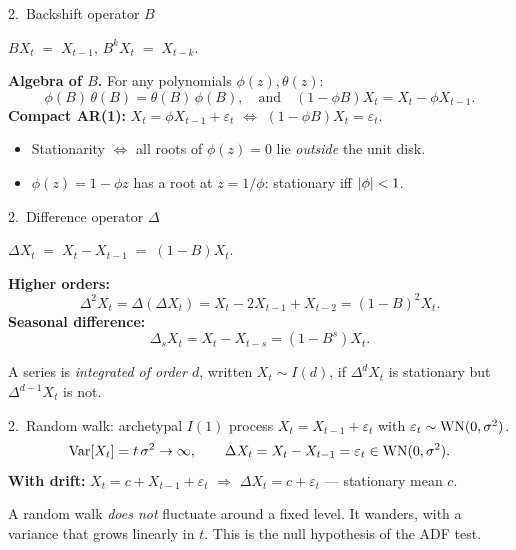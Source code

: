 \documentclass[aspectratio=169]{beamer}
\begin{document}
\begin{frame}{2.~Backshift operator $B$}
  \begin{defbox}[Backshift]
    $B X_t \;=\; X_{t-1}$, $B^k X_t \;=\; X_{t-k}$.
  \end{defbox}
  \medskip
  \textbf{Algebra of $B$.} For any polynomials $\phi(z), \theta(z)$:
  \[
    \phi(B)\, \theta(B) = \theta(B)\, \phi(B), \quad \text{and}
    \quad
    (1 - \phi B) X_t = X_t - \phi X_{t-1}.
  \]
  \medskip
  \textbf{Compact AR(1):} $X_t = \phi X_{t-1} + \varepsilon_t$
  $\Leftrightarrow$ $(1 - \phi B) X_t = \varepsilon_t$.
  \medskip
  \begin{itemize}
    \item Stationarity $\Leftrightarrow$ all roots of $\phi(z) = 0$
          lie \emph{outside} the unit disk.
    \item $\phi(z) = 1 - \phi z$ has a root at $z = 1/\phi$:
          stationary iff $\left\lvert \phi \right\rvert < 1$.
  \end{itemize}
\end{frame}

\begin{frame}{2.~Difference operator $\Delta$}
  \begin{defbox}[Difference]
    $\Delta X_t \;=\; X_t - X_{t-1} \;=\; (1 - B) X_t$.
  \end{defbox}
  \medskip
  \textbf{Higher orders:}
  \[
    \Delta^2 X_t = \Delta(\Delta X_t) = X_t - 2 X_{t-1} + X_{t-2}
                = (1 - B)^2 X_t.
  \]
  \medskip
  \textbf{Seasonal difference:}
  \[
    \Delta_s X_t = X_t - X_{t-s} = (1 - B^s) X_t.
  \]
  \medskip
  \begin{infobox}
    A series is \emph{integrated of order $d$}, written
    $X_t \sim I(d)$, if $\Delta^d X_t$ is stationary but
    $\Delta^{d-1} X_t$ is not.
  \end{infobox}
\end{frame}

\begin{frame}{2.~Random walk: archetypal $I(1)$ process}
  $X_t = X_{t-1} + \varepsilon_t$ with $\varepsilon_t \sim \mathrm{WN}(0, \sigma^2)$.
  \[
    \mathrm{Var}[X_t] = t\,\sigma^2 \to \infty,
    \qquad
    \Delta X_t = X_t - X_{t-1} = \varepsilon_t \in \mathrm{WN}(0, \sigma^2).
  \]
  \medskip
  \textbf{With drift:} $X_t = c + X_{t-1} + \varepsilon_t$
  $\Rightarrow$ $\Delta X_t = c + \varepsilon_t$ — stationary mean $c$.
  \medskip
  \begin{warnbox}
    A random walk \emph{does not} fluctuate around a fixed level. It
    wanders, with a variance that grows linearly in $t$. This is the
    null hypothesis of the ADF test.
  \end{warnbox}
\end{frame}
\end{document}

